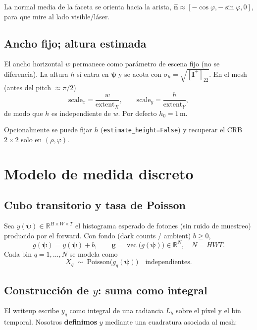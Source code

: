 \documentclass[11pt,a4paper]{article}
\theoremstyle{definition}
\newcommand{\vect}[1]{\boldsymbol{#1}}
\newcommand{\matr}[1]{\mathbf{#1}}
\newcommand{\R}{\mathbb{R}}
\begin{document}
La normal media de la faceta se orienta hacia la arista,
$\hat{\vect{n}}\approx[-\cos\varphi,-\sin\varphi,0]$, para que mire al
lado visible/l\'aser.

\subsection{Ancho fijo; altura estimada}
El ancho horizontal $w$ permanece como par\'ametro de escena fijo
(no se diferencia). La altura $h$ s\'i entra en $\vect{\psi}$ y se acota
con $\sigma_h=\sqrt{[\matr{I}^{+}]_{22}}$.
En el mesh (antes del pitch $\approx\pi/2$)
\begin{equation}
    \mathrm{scale}_x = \frac{w}{\mathrm{extent}_X},
    \qquad
    \mathrm{scale}_y = \frac{h}{\mathrm{extent}_Y},
\end{equation}
de modo que $h$ es independiente de $w$.
Por defecto $h_0=1\,\mathrm{m}$.

Opcionalmente se puede fijar $h$ (\texttt{estimate\_height=False}) y
recuperar el CRB $2\times 2$ solo en $(\rho,\varphi)$.

\section{Modelo de medida discreto}
\label{sec:medida}

\subsection{Cubo transitorio y tasa de Poisson}
Sea $y(\vect{\psi})\in\R^{H\times W\times T}$ el histograma esperado de
fotones (sin ruido de muestreo) producido por el forward.
Con fondo (dark counts / ambient) $b\ge 0$,
\begin{equation}
    g(\vect{\psi})
    =
    y(\vect{\psi}) + b,
    \qquad
    \vect{g}
    =
    \operatorname{vec}\bigl(g(\vect{\psi})\bigr)\in\R^{N},
    \quad
    N = HWT.
    \label{eq:g}
\end{equation}
Cada bin $q=1,\ldots,N$ se modela como
\begin{equation}
    X_q \;\sim\; \mathrm{Poisson}\bigl(g_q(\vect{\psi})\bigr)
    \quad\text{independientes}.
    \label{eq:poisson}
\end{equation}

\subsection{Construcci\'on de $y$: suma como integral}
El writeup escribe $y_q$ como integral de una radiancia $L_h$ sobre el
p\'ixel y el bin temporal.
Nosotros \textbf{definimos} $y$ mediante una cuadratura asociada al mesh:
\end{document}
